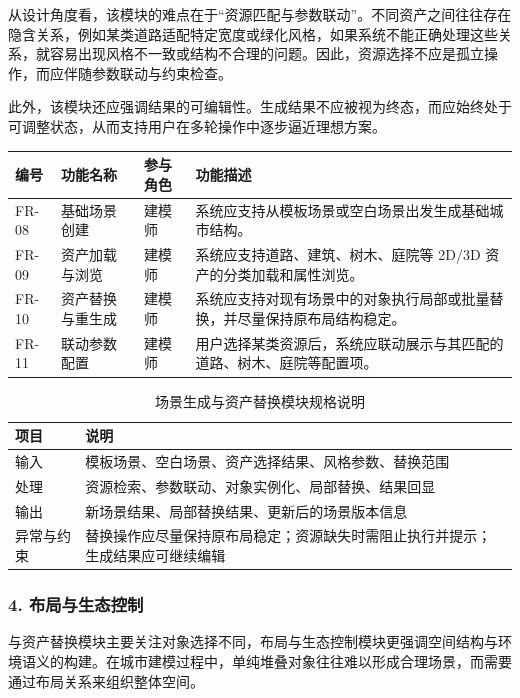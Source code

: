 \documentclass[UTF8,a4paper,10pt]{ctexart}
\begin{document}
从设计角度看，该模块的难点在于“资源匹配与参数联动”。不同资产之间往往存在隐含关系，例如某类道路适配特定宽度或绿化风格，如果系统不能正确处理这些关系，就容易出现风格不一致或结构不合理的问题。因此，资源选择不应是孤立操作，而应伴随参数联动与约束检查。

此外，该模块还应强调结果的可编辑性。生成结果不应被视为终态，而应始终处于可调整状态，从而支持用户在多轮操作中逐步逼近理想方案。

{
\renewcommand{\arraystretch}{1.35}

\begin{longtable}{p{1.8cm} p{2.5cm} p{2.1cm} p{6.4cm}}
\toprule
\rowcolor{gray!20}
编号 & 功能名称 & 参与角色 & 功能描述 \\
\midrule
FR-08 & 基础场景创建 & 建模师 & 系统应支持从模板场景或空白场景出发生成基础城市结构。 \\
FR-09 & 资产加载与浏览 & 建模师 & 系统应支持道路、建筑、树木、庭院等 2D/3D 资产的分类加载和属性浏览。 \\
FR-10 & 资产替换与重生成 & 建模师 & 系统应支持对现有场景中的对象执行局部或批量替换，并尽量保持原布局结构稳定。 \\
FR-11 & 联动参数配置 & 建模师 & 用户选择某类资源后，系统应联动展示与其匹配的道路、树木、庭院等配置项。 \\
\bottomrule
\end{longtable}
}

{
\renewcommand{\arraystretch}{1.3}
\begin{table}[H]
\centering
\caption{场景生成与资产替换模块规格说明}
\begin{tabularx}{\textwidth}{p{2.6cm} Y}
\toprule
{}
项目 & 说明 \\
\midrule
输入 & 模板场景、空白场景、资产选择结果、风格参数、替换范围 \\
处理 & 资源检索、参数联动、对象实例化、局部替换、结果回显 \\
输出 & 新场景结果、局部替换结果、更新后的场景版本信息 \\
异常与约束 & 替换操作应尽量保持原布局稳定；资源缺失时需阻止执行并提示；生成结果应可继续编辑 \\
\bottomrule
\end{tabularx}
\end{table}
}

\subsubsection*{4. 布局与生态控制}
与资产替换模块主要关注对象选择不同，布局与生态控制模块更强调空间结构与环境语义的构建。在城市建模过程中，单纯堆叠对象往往难以形成合理场景，而需要通过布局关系来组织整体空间。
\end{document}
